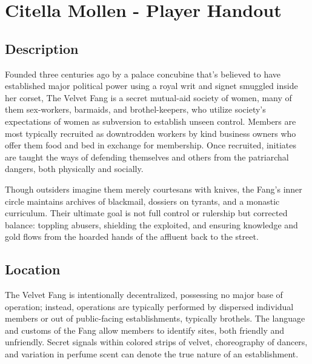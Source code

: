 \documentclass[letterpaper,twocolumn,openany,nodeprecatedcode,bg=full]{dndbook}
\begin{document}
\mainmatter%

\chapter{Citella Mollen - Player Handout}


\section*{Description}
Founded three centuries ago by a palace concubine that's believed to have established major political power using a royal writ and signet smuggled inside her corset, The Velvet Fang is a secret mutual-aid society of women, many of them sex-workers, barmaids, and brothel-keepers, who utilize society’s expectations of women as subversion to establish unseen control. Members are most typically recruited as downtrodden workers by kind business owners who offer them food and bed in exchange for membership. Once recruited, initiates are taught the ways of defending themselves and others from the patriarchal dangers, both physically and socially.

Though outsiders imagine them merely courtesans with knives, the Fang’s inner circle maintains archives of blackmail, dossiers on tyrants, and a monastic curriculum. Their ultimate goal is not full control or rulership but corrected balance: toppling abusers, shielding the exploited, and ensuring knowledge and gold flows from the hoarded hands of the affluent back to the street.

\section*{Location}
The Velvet Fang is intentionally decentralized, possessing no major base of operation; instead, operations are typically performed by dispersed individual members or out of public-facing establishments, typically brothels. The language and customs of the Fang allow members to identify sites, both friendly and unfriendly. Secret signals within colored strips of velvet, choreography of dancers, and variation in perfume scent can denote the true nature of an establishment.
\end{document}

